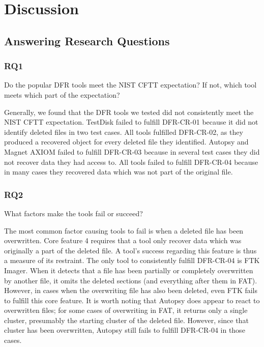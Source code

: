 \section{Discussion}

\subsection{Answering Research Questions}

\begin{paraphrase}
 \subsubsection{RQ1}
Do the popular DFR tools meet the NIST CFTT expectation? 
If not, which tool meets which part of the expectation? 

Generally, we found that the DFR tools we tested did not consistently meet the NIST CFTT expectation.
TestDisk failed to fulfill DFR-CR-01 because it did not identify deleted files in two test cases.
All tools fulfilled DFR-CR-02, as they produced a recovered object for every deleted file they identified.
Autopsy and Magnet AXIOM failed to fulfill DFR-CR-03 because in several test cases they did not recover data they had access to.
All tools failed to fulfill DFR-CR-04 because in many cases they recovered data which was not part of the original file.

\subsubsection{RQ2}
What factors make the tools fail or succeed?

The most common factor causing tools to fail is when a deleted file has been overwritten.
Core feature 4 requires that a tool only recover data which was originally a part of the deleted file.
A tool's success regarding this feature is thus a measure of its restraint.
The only tool to consistently fulfill DFR-CR-04 is FTK Imager.
When it detects that a file has been partially or completely overwritten by another file, it omits the deleted sections (and everything after them in FAT).
However, in cases when the overwriting file has also been deleted, even FTK fails to fulfill this core feature.
It is worth noting that Autopsy does appear to react to overwritten files; for some cases of overwriting in FAT, it returns only a single cluster, presumably the starting cluster of the deleted file.
However, since that cluster has been overwritten, Autopsy still fails to fulfill DFR-CR-04 in those cases.


\end{paraphrase}
